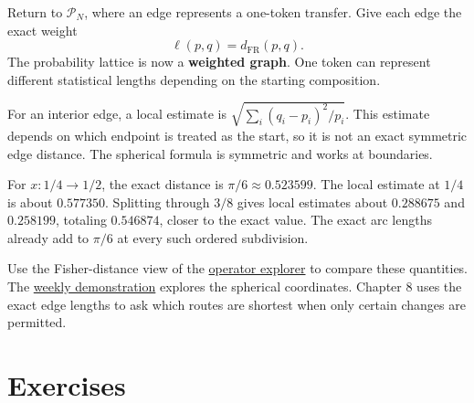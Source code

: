 \documentclass[11pt,oneside,openany]{book}
\theoremstyle{definition}
\theoremstyle{remark}
\numberwithin{equation}{chapter}
\begin{document}
Return to \(\mathcal P_N\), where an edge represents a one-token transfer. Give each edge the exact weight \[\ell(p,q)=d_{\mathrm{FR}}(p,q).\] The probability lattice is now a \textbf{weighted graph}. One token can represent different statistical lengths depending on the starting composition.

For an interior edge, a local estimate is \(\sqrt{\sum_i(q_i-p_i)^2/p_i}\). This estimate depends on which endpoint is treated as the start, so it is not an exact symmetric edge distance. The spherical formula is symmetric and works at boundaries.

For \(x:1/4\to1/2\), the exact distance is \(\pi/6\approx0.523599\). The local estimate at \(1/4\) is about \(0.577350\). Splitting through \(3/8\) gives local estimates about \(0.288675\) and \(0.258199\), totaling \(0.546874\), closer to the exact value. The exact arc lengths already add to \(\pi/6\) at every such ordered subdivision.

Use the Fisher-distance view of the \href{https://bobovski66.github.io/IntroDiscreteInfoGeom/demos/operator-explorer.html}{operator explorer} to compare these quantities. The \href{https://bobovski66.github.io/IntroDiscreteInfoGeom/demos/week07.html}{weekly demonstration} explores the spherical coordinates. Chapter 8 uses the exact edge lengths to ask which routes are shortest when only certain changes are permitted.

\section{Exercises}\label{ch07-exercises}
\end{document}
